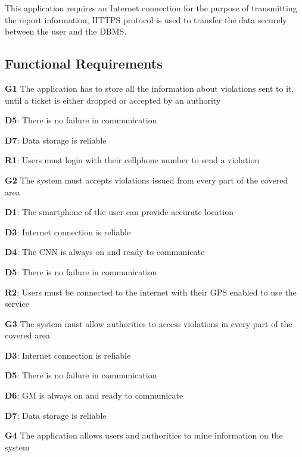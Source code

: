 This application requires an Internet connection for the purpose of transmitting the report information, HTTPS protocol is used to transfer the data securely between the user and the DBMS.

\subsection{Functional Requirements}
\begin{outline}

\1  \textbf{G1} The application has to store all the information about violations sent to it, until a ticket is either dropped or accepted by an authority

\2 \textbf{D5}: There is no failure in communication

\2 \textbf{D7}: Data storage is reliable

\2 \textbf{R1}: Users must login with their cellphone number to send a violation



\1  \textbf{G2} The system must accepts violations issued from every part of the covered area

\2 \textbf{D1}: The smartphone of the user can provide accurate location

\2 \textbf{D3}: Internet connection is reliable

\2 \textbf{D4}: The CNN is always on and ready to communicate

\2 \textbf{D5}: There is no failure in communication

\2 \textbf{R2}: Users must be connected to the internet with their GPS enabled to use the service


 
\1  \textbf{G3} The system must allow authorities to access violations in every part of the covered area

\2 \textbf{D3}: Internet connection is reliable

\2 \textbf{D5}: There is no failure in communication

\2 \textbf{D6}: GM is always on and ready to communicate

\2 \textbf{D7}: Data storage is reliable


\1  \textbf{G4} The application allows users and authorities to mine information on the system


\end{outline}
